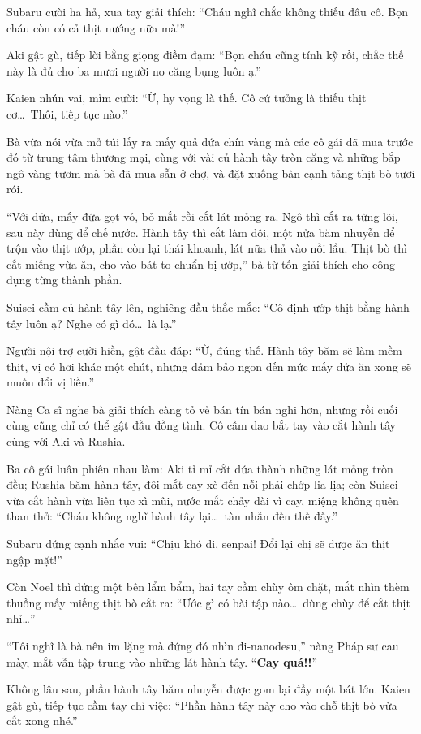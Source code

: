 \documentclass[../main.tex]{subfiles}
\begin{document}
Subaru cười ha hả, xua tay giải thích: ``Cháu nghĩ chắc không thiếu đâu cô. Bọn cháu còn có cả thịt nướng nữa mà!''

Aki gật gù, tiếp lời bằng giọng điềm đạm: ``Bọn cháu cũng tính kỹ rồi, chắc thế này là đủ cho ba mươi người no căng bụng luôn ạ.''

Kaien nhún vai, mỉm cười: ``Ừ, hy vọng là thế. Cô cứ tưởng là thiếu thịt cơ\dots\ Thôi, tiếp tục nào.''

Bà vừa nói vừa mở túi lấy ra mấy quả dứa chín vàng mà các cô gái đã mua trước đó từ trung tâm thương mại, cùng với vài củ hành tây tròn căng và những bắp ngô vàng tươm mà bà đã mua sẵn ở chợ, và đặt xuống bàn cạnh tảng thịt bò tươi rói.

``Với dứa, mấy đứa gọt vỏ, bỏ mắt rồi cắt lát mỏng ra. Ngô thì cắt ra từng lõi, sau này dùng để chế nước. Hành tây thì cắt làm đôi, một nửa băm nhuyễn để trộn vào thịt ướp, phần còn lại thái khoanh, lát nữa thả vào nồi lẩu. Thịt bò thì cắt miếng vừa ăn, cho vào bát to chuẩn bị ướp,'' bà từ tốn giải thích cho công dụng từng thành phần.

Suisei cầm củ hành tây lên, nghiêng đầu thắc mắc: ``Cô định ướp thịt bằng hành tây luôn ạ? Nghe có gì đó\dots\ là lạ.''

Người nội trợ cười hiền, gật đầu đáp: ``Ừ, đúng thế. Hành tây băm sẽ làm mềm thịt, vị có hơi khác một chút, nhưng đảm bảo ngon đến mức mấy đứa ăn xong sẽ muốn đổi vị liền.''

Nàng Ca sĩ nghe bà giải thích càng tỏ vẻ bán tín bán nghi hơn, nhưng rồi cuối cùng cũng chỉ có thể gật đầu đồng tình. Cô cầm dao bắt tay vào cắt hành tây cùng với Aki và Rushia.

Ba cô gái luân phiên nhau làm: Aki tỉ mỉ cắt dứa thành những lát mỏng tròn đều; Rushia băm hành tây, đôi mắt cay xè đến nỗi phải chớp lia lịa; còn Suisei vừa cắt hành vừa liên tục xì mũi, nước mắt chảy dài vì cay, miệng không quên than thở: ``Cháu không nghĩ hành tây lại\dots\ tàn nhẫn đến thế đấy.''

Subaru đứng cạnh nhắc vui: ``Chịu khó đi, senpai! Đổi lại chị sẽ được ăn thịt ngập mặt!''

Còn Noel thì đứng một bên lẩm bẩm, hai tay cầm chùy ôm chặt, mắt nhìn thèm thuồng mấy miếng thịt bò cắt ra: ``Ước gì có bài tập nào\dots\ dùng chùy để cắt thịt nhỉ\dots''

``Tôi nghĩ là bà nên im lặng mà đứng đó nhìn đi-nanodesu,'' nàng Pháp sư cau mày, mắt vẫn tập trung vào những lát hành tây. ``\textbf{Cay quá!!}''

Không lâu sau, phần hành tây băm nhuyễn được gom lại đầy một bát lớn. Kaien gật gù, tiếp tục cầm tay chỉ việc: ``Phần hành tây này cho vào chỗ thịt bò vừa cắt xong nhé.''
\end{document}
